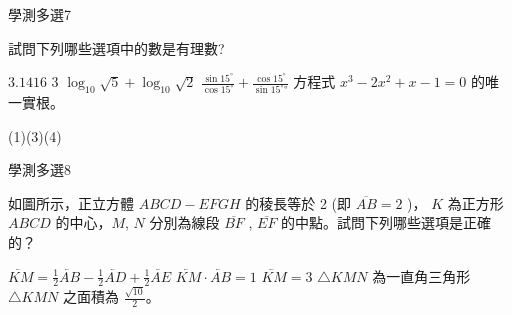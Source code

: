 \begin{QUESTIONS}
    \begin{QUESTION}
        \begin{ExamInfo}{98}{學測}{多選}{7}
        \end{ExamInfo}
        \begin{ExamAnsRateInfo}{39}{67}{35}{15}
        \end{ExamAnsRateInfo}
        \begin{QBODY}
            試問下列哪些選項中的數是有理數? 
			\begin{QOPS} 
				\QOP $3.1416$
				\QOP $3$ 
				\QOP $\log_{10} \sqrt{5}+ \log_{10}\sqrt{2}$ 
				\QOP $\frac{\sin{15^\circ}}{\cos{15^\circ}} +  \frac{\cos{15^\circ}}{\sin{15^\circ°}}$ \quad 
				\QOP 方程式 $x^3 - 2x^2 +x-1=0$ 的唯一實根。
			\end{QOPS}
        \end{QBODY}
        \begin{QFROMS}
        \end{QFROMS}
        \begin{QTAGS}\end{QTAGS}
        \begin{QANS}
            (1)(3)(4)
        \end{QANS}
        \begin{QSOLLIST}
        \end{QSOLLIST}
        \begin{QEMPTYSPACE}
        \end{QEMPTYSPACE}
    \end{QUESTION}
    \begin{QUESTION}
        \begin{ExamInfo}{98}{學測}{多選}{8}
        \end{ExamInfo}
        \begin{ExamAnsRateInfo}{46}{80}{42}{16}
        \end{ExamAnsRateInfo}
        \begin{QBODY}
            如圖所示，正立方體 $ABCD - EFGH$ 的稜長等於 2 (即 $\overline{AB} = 2$ )， $K$ 為正方形 $ABCD $ 的中心，$M$, $N$ 分別為線段 $\overline{BF}$ ,  $\overline{EF}$ 的中點。試問下列哪些選項是正確的？ 
			\begin{QOPS} 
				\QOP  $\lvec{KM} = \frac{1}{2} \lvec{AB} - \frac{1}{2} \lvec{AD} + \frac{1}{2} \lvec{AE}$ 
				\QOP $\lvec{KM} \cdot \lvec{AB}=1$ 
				\QOP $\lvec{KM}=3$ 
				\QOP  $\triangle KMN$ 為一直角三角形 
				\QOP $\triangle KMN$ 之面積為 $\frac{\sqrt{10}}{2}$。
			\end{QOPS}

\end{QBODY}
\end{QUESTION}
\end{QUESTIONS}
